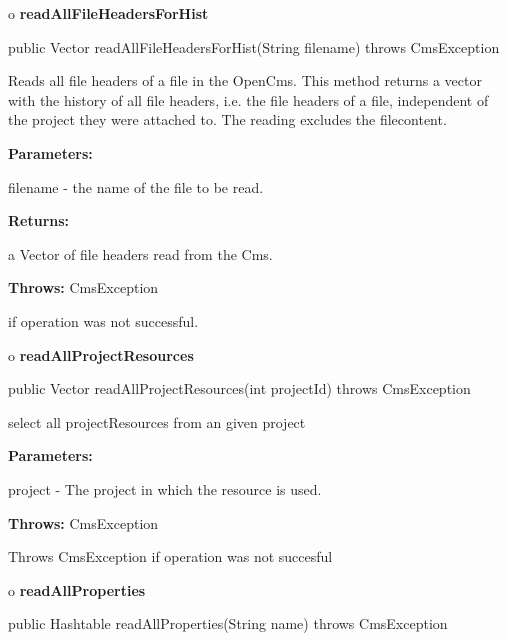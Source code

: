 o {\bf readAllFileHeadersForHist} 

\begin{PRE}
 public Vector readAllFileHeadersForHist(String filename) throws CmsException
\end{PRE}

\begin{description}
\htmlDD Reads all file headers of a file in the OpenCms. \htmlBR
This method returns a vector with the history of all file headers, i.e. the
file headers of a file, independent of the project they were attached
to.\htmlBR
The reading excludes the filecontent. 

\begin{description}
\item {\bf Parameters:}  

filename - the name of the file to be read.  
\item {\bf Returns:}  

a Vector of file headers read from the Cms.  
\item {\bf Throws:} CmsException  

if operation was not successful.  
\end{description}

\end{description}

o {\bf readAllProjectResources} 

\begin{PRE}
 public Vector readAllProjectResources(int projectId) throws CmsException
\end{PRE}

\begin{description}
\htmlDD select all projectResources from an given project 

\begin{description}
\item {\bf Parameters:}  

project - The project in which the resource is used.  
\item {\bf Throws:} CmsException  

Throws CmsException if operation was not succesful  
\end{description}

\end{description}

o {\bf readAllProperties} 

\begin{PRE}
 public Hashtable readAllProperties(String name) throws CmsException
\end{PRE}

